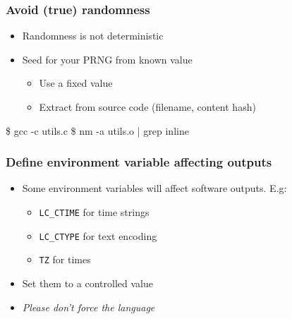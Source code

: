 \documentclass[14pt,aspectratio=169]{beamer}
\begin{document}
{
\begin{frame}[fragile]
 \frametitle{Avoid (true) randomness}

 \begin{itemize}
  \item Randomness is not deterministic
  \item<2-> Seed for your PRNG from known value
   \begin{itemize}
     \item Use a fixed value
     \item<3> Extract from source code (filename, content hash)
   \end{itemize}
 \end{itemize}

 \begin{example}
\begin{semiverbatim}\small
\$ gcc -c utils.c
\$ nm -a utils.o | grep inline
\end{semiverbatim}
 \end{example}
\end{frame}
}

\begin{frame}
 \frametitle{Define environment variable affecting outputs}

 \begin{itemize}
  \item Some environment variables will affect software outputs. E.g:
   \begin{itemize}
    \item \texttt{LC\_CTIME} for time strings
    \item \texttt{LC\_CTYPE} for text encoding
    \item \texttt{TZ} for times
   \end{itemize}
  \item<2-> Set them to a controlled value
  \item<3> \textit{Please don't force the language}
 \end{itemize}
\end{frame}
\end{document}

